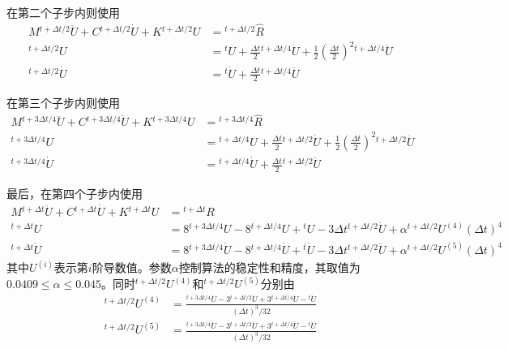 在第二个子步内则使用
\begin{equation}
\begin{split}
M{^{t+\Delta t/2}\!\ddot{U}}+C{^{t+\Delta t/2}\!\dot{U}}+K{^{t+\Delta t/2}\!{U}}&={^{t+\Delta t/2}\!\hat{R}}\\
{^{t+\Delta t/2}\!U}&={^t\!U}+\frac{\Delta t}{2}{^{t+\Delta t/4}\!\dot{U}}+\frac12\left(\frac{\Delta t}{2}\right)^2{^{t+\Delta t/4}\!\ddot{U}}\\
{^{t+\Delta t/2}\!\dot{U}}&={^t\!\dot{U}}+\frac{\Delta t}{2}{^{t+\Delta t/4}\!\ddot{U}}
\end{split}
\end{equation}

在第三个子步内则使用
\begin{equation}
\begin{split}
M{^{t+3\Delta t/4}\!\ddot{U}}+C{^{t+3\Delta t/4}\!\dot{U}}+K{^{t+3\Delta t/4}\!{U}}&={^{t+3\Delta t/4}\!\hat{R}}\\
{^{t+3\Delta t/4}\!U}&={^{t+\Delta t/4}\!U}+\frac{\Delta t}{2}{^{t+\Delta t/2}\!\dot{U}}+\frac12\left(\frac{\Delta t}{2}\right)^2{^{t+\Delta t/2}\!\ddot{U}}\\
{^{t+3\Delta t/4}\!\dot{U}}&={^{t+\Delta t/4}\!\dot{U}}+\frac{\Delta t}{2}{^{t+\Delta t/2}\!\ddot{U}}
\end{split}
\end{equation}

最后，在第四个子步内使用
\begin{equation}
\begin{split}
M{^{t+\Delta t}\!\ddot{U}}+C{^{t+\Delta t}\!\dot{U}}+K{^{t+\Delta t}\!{U}}&={^{t+\Delta t}\!{R}}\\
{^{t+\Delta t}\!U}&=8{^{t+3\Delta t/4}\!U}-8{^{t+\Delta t/4}\!U}+{^t\!U}-3\Delta t{^{t+\Delta t/2}\!\dot{U}}+\alpha{^{t+\Delta t/2}\!U^{(4)}}(\Delta t)^4\\
{^{t+\Delta t}\!\dot{U}}&=8{^{t+3\Delta t/4}\!\dot{U}}-8{^{t+\Delta t/4}\!\dot{U}}+{^t\!\dot{U}}-3\Delta t{^{t+\Delta t/2}\!\ddot{U}}+\alpha{^{t+\Delta t/2}\!U^{(5)}}(\Delta t)^4
\end{split}
\end{equation}
其中$U^{(i)}$表示第$i$阶导数值。参数$\alpha$控制算法的稳定性和精度，其取值为$0.0409\le\alpha\le0.045$。同时${^{t+\Delta t/2}\!U^{(4)}}$和${^{t+\Delta t/2}\!U^{(5)}}$分别由
\begin{align}
{^{t+\Delta t/2}\!U^{(4)}}&=\frac{{^{t+3\Delta t/4}\!\dot{U}}-3{^{t+\Delta t/2}\!\dot{U}}+3{^{t+\Delta t/4}\!\dot{U}}-{^{t}\!\dot{U}}}{(\Delta t)^3/32}\\
{^{t+\Delta t/2}\!U^{(5)}}&=\frac{{^{t+3\Delta t/4}\!\ddot{U}}-3{^{t+\Delta t/2}\!\ddot{U}}+3{^{t+\Delta t/4}\!\ddot{U}}-{^{t}\!\ddot{U}}}{(\Delta t)^3/32}
\end{align}

